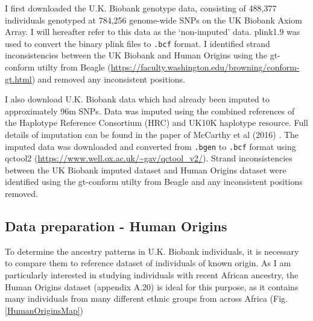 I first downloaded the U.K. Biobank genotype data, consisting of 488,377 individuals genotyped at 784,256 genome-wide SNPs on the UK Biobank Axiom Array. I will hereafter refer to this data as the `non-imputed' data. plink1.9 \cite{purcell2007plink} was used to convert the binary plink files to \texttt{.bcf} format. I identified strand inconsistencies between the UK Biobank and Human Origins using the gt-conform utilty from Beagle (\url{https://faculty.washington.edu/browning/conform-gt.html}) and removed any inconsistent positions. 

I also download U.K. Biobank data which had already been imputed to approximately 96m SNPs. Data was imputed using the combined references of the Haplotype Reference Consortium (HRC) and UK10K haplotype resource. Full details of imputation can be found in the paper of McCarthy et al (2016) \cite{mccarthy2016reference}. The imputed data was downloaded and converted from \texttt{.bgen} to \texttt{.bcf} format using qctool2 (\url{https://www.well.ox.ac.uk/~gav/qctool_v2/}). Strand inconsistencies between the UK Biobank imputed dataset and Human Origins dataset were identified using the gt-conform utilty from Beagle and any inconsistent positions removed.

\subsection{Data preparation - Human Origins}

To determine the ancestry patterns in U.K. Biobank individuals, it is necessary to compare them to reference dataset of individuals of known origin. As I am particularly interested in studying individuals with recent African ancestry, the Human Origins dataset (appendix A.20) is ideal for this purpose, as it contains many individuals from many different ethnic groups from across Africa (Fig. \ref{HumanOriginsMap}) 

